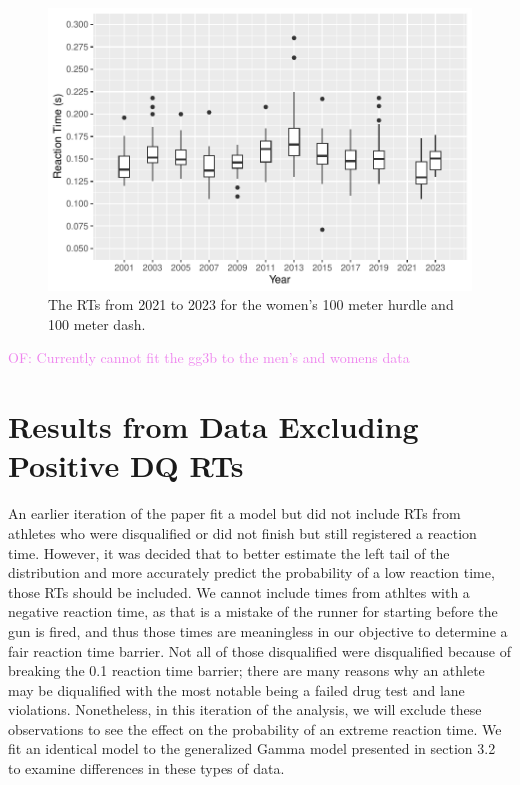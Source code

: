 \documentclass[12pt, letterpaper]{article}
\newcommand{\of}[1]{\textcolor{violet}{OF: #1}}
\begin{document}
\begin{figure}[tbp]
  \centering
  \includegraphics[width=\textwidth]{WomensBoxplot}
  \caption{The RTs from 2021 to 2023 for the women's 100 meter hurdle
  and 100 meter dash.}
  \label{fig:WomensBoxplot}
\end{figure}


\of{Currently cannot fit the gg3b to the men's and womens data}


\section{Results from Data Excluding Positive DQ RTs}
An earlier iteration of the paper fit a model but did not include RTs from
athletes who were disqualified or did not finish but still registered a reaction
time.  However, it was decided that to better estimate the left tail of the
distribution and more accurately predict the probability of a low reaction time,
those RTs should be included.  We cannot include times from athltes with a
negative reaction time, as that is a mistake of the runner for starting before
the gun is fired, and thus those times are meaningless in our objective to
determine a fair reaction time barrier.  Not all of those disqualified were
disqualified because of breaking the 0.1 reaction time barrier; there are many
reasons why an athlete may be diqualified with the most notable being a failed
drug test and lane violations.  Nonetheless, in this iteration of the analysis,
we will exclude these observations to see the effect on the probability of an
extreme reaction time.  We fit an identical model to the generalized Gamma model
presented in section 3.2 to examine differences in these types of data.
\end{document}
